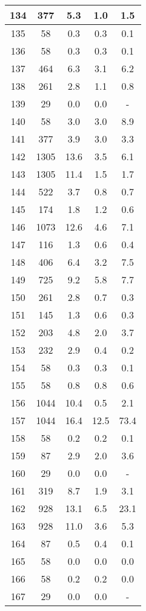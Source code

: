 \documentclass[a4paper,10pt]{article}
\begin{document}
\begin{table}
\begin{tabular}{|c|c|c|c|c|}
\hline
134 & 377 & 5.3 & 1.0 & 1.5 \\
\hline
135 & 58 & 0.3 & 0.3 & 0.1 \\
\hline
136 & 58 & 0.3 & 0.3 & 0.1 \\
\hline
137 & 464 & 6.3 & 3.1 & 6.2 \\
\hline
138 & 261 & 2.8 & 1.1 & 0.8 \\
\hline
139 & 29 & 0.0 & 0.0 & - \\
\hline
140 & 58 & 3.0 & 3.0 & 8.9 \\
\hline
141 & 377 & 3.9 & 3.0 & 3.3 \\
\hline
142 & 1305 & 13.6 & 3.5 & 6.1 \\
\hline
143 & 1305 & 11.4 & 1.5 & 1.7 \\
\hline
144 & 522 & 3.7 & 0.8 & 0.7 \\
\hline
145 & 174 & 1.8 & 1.2 & 0.6 \\
\hline
146 & 1073 & 12.6 & 4.6 & 7.1 \\
\hline
147 & 116 & 1.3 & 0.6 & 0.4 \\
\hline
148 & 406 & 6.4 & 3.2 & 7.5 \\
\hline
149 & 725 & 9.2 & 5.8 & 7.7 \\
\hline
150 & 261 & 2.8 & 0.7 & 0.3 \\
\hline
151 & 145 & 1.3 & 0.6 & 0.3 \\
\hline
152 & 203 & 4.8 & 2.0 & 3.7 \\
\hline
153 & 232 & 2.9 & 0.4 & 0.2 \\
\hline
154 & 58 & 0.3 & 0.3 & 0.1 \\
\hline
155 & 58 & 0.8 & 0.8 & 0.6 \\
\hline
156 & 1044 & 10.4 & 0.5 & 2.1 \\
\hline
157 & 1044 & 16.4 & 12.5 & 73.4 \\
\hline
158 & 58 & 0.2 & 0.2 & 0.1 \\
\hline
159 & 87 & 2.9 & 2.0 & 3.6 \\
\hline
160 & 29 & 0.0 & 0.0 & - \\
\hline
161 & 319 & 8.7 & 1.9 & 3.1 \\
\hline
162 & 928 & 13.1 & 6.5 & 23.1 \\
\hline
163 & 928 & 11.0 & 3.6 & 5.3 \\
\hline
164 & 87 & 0.5 & 0.4 & 0.1 \\
\hline
165 & 58 & 0.0 & 0.0 & 0.0 \\
\hline
166 & 58 & 0.2 & 0.2 & 0.0 \\
\hline
167 & 29 & 0.0 & 0.0 & - \\

\end{tabular}
\end{table}
\end{document}
